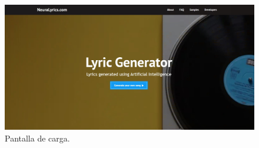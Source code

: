\documentclass[12pt, a4paper, titlepage]{article}
\begin{document}
	\begin{figure}[H] 
		\includegraphics[width=13.5cm]{./Imagenes/Capturas/pprincipal.jpg}
		\centering \caption{Pantalla de carga.}
	\end{figure}
	
\end{document}
